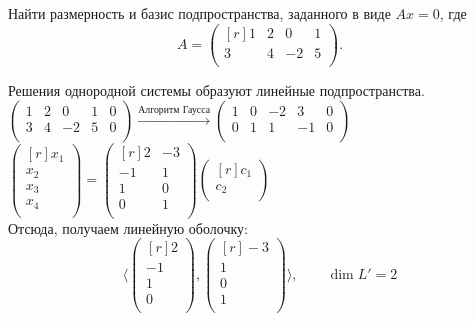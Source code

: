 \begin{prim}
	Найти размерность и базис подпространства, заданного в виде $Ax=0$, где
	$$
	A = 
	\begin{pmatrix*}[r]
	1 & 2 & 0 & 1\\
	3 & 4 & -2 & 5\\
	\end{pmatrix*}.
	$$
\end{prim}
Решения однородной системы образуют линейные подпространства.\\
$
\left(
\begin{array}{cccc|c}
1 & 2 & 0 & 1 & 0\\
3 & 4 & -2 & 5 & 0\\
\end{array}
\right)
\xrightarrow{\text{Алгоритм Гаусса}}
\left(
\begin{array}{cccc|c}
1 & 0 & -2 & 3 & 0\\
0 & 1 & 1 & -1 & 0\\
\end{array}
\right)
$\\
$
\begin{pmatrix*}[r]
x_1\\
x_2\\
x_3\\
x_4\\
\end{pmatrix*}
=
\begin{pmatrix*}[r]
2 & -3\\
-1 & 1\\
1 & 0\\
0 & 1\\
\end{pmatrix*}
\begin{pmatrix*}[r]
c_1\\
c_2\\
\end{pmatrix*}
$\\
Отсюда, получаем линейную оболочку:
$$
\langle 
\begin{pmatrix*}[r]
2\\
-1\\
1\\
0\\
\end{pmatrix*}
,
\begin{pmatrix*}[r]
-3\\
1\\
0\\
1\\
\end{pmatrix*}
\rangle 
, \qquad \dim L' = 2
$$
